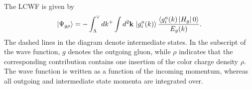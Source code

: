 \documentclass[a4paper,11pt]{article}
\begin{document}
\begin{figure}[htbp]
\centering
\end{figure}
The LCWF is given by
\begin{align}
    \left|\Psi_{g\rho}\right\rangle
    = - \int_{\Lambda}^{\vee} dk^{+} \int d^{2}\mathbf{k}\,
    \ket{g^{a}_{i}(k)}
    \frac{\left\langle g_{i}^{a}(k)\left| H_{g}\right|0\right\rangle}
    {E_{g}(k)}.
\end{align}
The dashed lines in the diagram denote intermediate states. In the subscript of the wave function, $g$ denotes the outgoing gluon, while $\rho$ indicates that the corresponding contribution contains one insertion of the color charge density $\rho$. The wave function is written as a function of the incoming momentum, whereas all outgoing and intermediate state momenta are integrated over.
\end{document}
